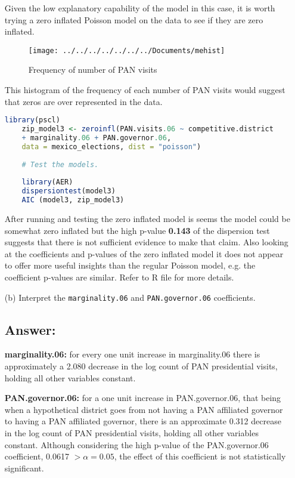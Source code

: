 \documentclass[12pt,letterpaper]{article}
\begin{document}
\begin{enumerate}
Given the low explanatory capability of the model in this case, it is worth trying a zero inflated Poisson model on the data to see if they are zero inflated.

\begin{figure}[tbph]
	\centering
	\texttt{[image: ../../../../../../../Documents/mehist]}
	\caption{Frequency of number of PAN visits}
	\label{fig:mehist}
\end{figure}

\vspace{7cm}

This histogram of the frequency of each number of PAN visits would suggest that zeros are over represented in the data.

\begin{lstlisting}[language=R]
	library(pscl)
	zip_model3 <- zeroinfl(PAN.visits.06 ~ competitive.district
	+ marginality.06 + PAN.governor.06,
	data = mexico_elections, dist = "poisson")
	
	# Test the models.
	
	library(AER)
	dispersiontest(model3)
	AIC (model3, zip_model3)
\end{lstlisting}

After running and testing the zero inflated model is seems the model could be somewhat zero inflated but the high p-value \textbf{0.143} of the dispersion test suggests that there is not sufficient evidence to make that claim. Also looking at the coefficients and p-values of the zero inflated model it does not appear to offer more useful insights than the regular Poisson model, e.g. the coefficient p-values are similar. Refer to R file for more details.

	\item [(b)]
	Interpret the \texttt{marginality.06} and \texttt{PAN.governor.06} coefficients.
	

\subsection*{Answer:}

\textbf{marginality.06:} for every one unit increase in marginality.06 there is approximately a 2.080 decrease in the log count of PAN presidential visits, holding all other variables constant.

\textbf{PAN.governor.06:} for a one unit increase in PAN.governor.06, that being when a hypothetical district goes from not having a PAN affiliated governor to having a PAN affiliated governor, there is an approximate 0.312 decrease in the log count of PAN presidential visits, holding all other variables constant. Although considering the high p-value of the PAN.governor.06 coefficient, 0.0617 \(>\alpha=0.05\), the effect of this coefficient is not statistically significant.
	

\end{enumerate}
\end{document}
